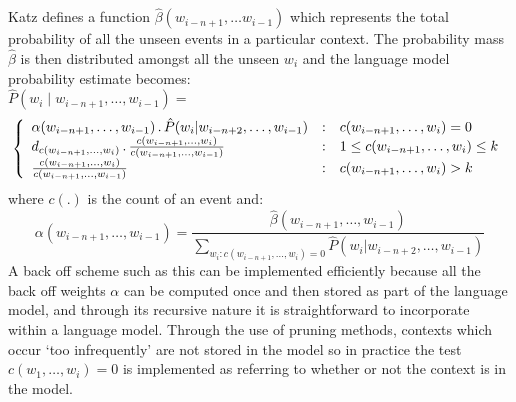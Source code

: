 Katz defines a function $\hat{\beta}(w_{i-n+1},
\ldots w_{i-1})$ which represents the total
probability of all the unseen events in a particular context. %
The probability mass $\hat{\beta}$ is then distributed amongst all the
unseen $w_i$ and the language model probability estimate becomes:%
%
\begin{equation}
\hat{P}(w_i \;|\; w_{i-n+1},\ldots,w_{i-1}) =\qquad{}\qquad{}\qquad{}\qquad{}\qquad{}\qquad{}\qquad{}\qquad{}\qquad{}\qquad{}\qquad{}\qquad{}\qquad{}\qquad{}\nonumber
\end{equation}
\vspace{-0.5cm}\begin{equation}
\left\{ \begin{array}{l@{\quad:\quad}l}
\alpha(w_{i-n+1}, \ldots, w_{i-1}) \,.\, \hat{P}(w_i | w_{i-n+2}, \ldots, w_{i-1}) &
c(w_{i-n+1}, \ldots, w_i) = 0\\
d_{c(w_{i-n+1}, \ldots, w_i)} \,.\, \frac{c(w_{i-n+1}, \ldots, w_i)}{c(w_{i-n+1},
\ldots, w_{i-1})} & 1 \le c(w_{i-n+1}, \ldots, w_i) \le k\\
\frac{c(w_{i-n+1}, \ldots, w_i)}{c(w_{i-n+1},
\ldots, w_{i-1})} & c(w_{i-n+1}, \ldots, w_i) > k\\
\end{array}\right.
\end{equation}
where $c(.)$ is the count of an event and:
\begin{equation}
\alpha(w_{i-n+1}, \ldots, w_{i-1}) = \frac{\hat{\beta}(w_{i-n+1},
\ldots, w_{i-1})} {\sum_{w_i: c(w_{i-n+1}, \ldots, w_i)=0}\hat{P}(w_i
| w_{i-n+2}, \ldots, w_{i-1})}
\end{equation}
A back off scheme such as this can be implemented efficiently because
all the back off weights $\alpha$ can be computed once and then stored
as part of the language model, and through its recursive nature it is
straightforward to incorporate within a language model.  Through the
use of pruning methods, contexts which occur `too infrequently' are not
stored in the model so in practice the test $c(w_1,\ldots,w_{i})=0$ is
implemented as referring to whether or not the context is in the model.

